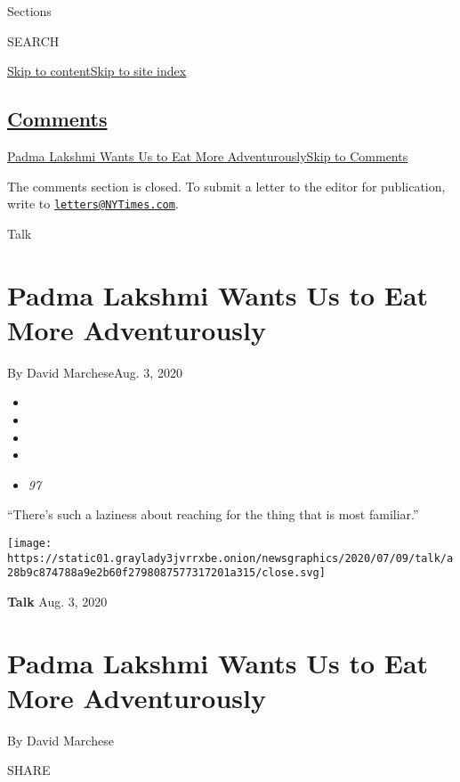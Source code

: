 Sections

SEARCH

\protect\hyperlink{site-content}{Skip to
content}\protect\hyperlink{site-index}{Skip to site index}

\hypertarget{comments}{%
\subsection{\texorpdfstring{\protect\hyperlink{commentsContainer}{Comments}}{Comments}}\label{comments}}

\href{}{Padma Lakshmi Wants Us to Eat More Adventurously}\href{}{Skip to
Comments}

The comments section is closed. To submit a letter to the editor for
publication, write to
\href{mailto:letters@NYTimes.com}{\nolinkurl{letters@NYTimes.com}}.

Talk

\hypertarget{padma-lakshmi-wants-us-to-eat-more-adventurously}{%
\section{Padma Lakshmi Wants Us to Eat More
Adventurously}\label{padma-lakshmi-wants-us-to-eat-more-adventurously}}

By David MarcheseAug. 3, 2020

\begin{itemize}
\item
\item
\item
\item
\item
  \emph{97}
\end{itemize}

``There's such a laziness about reaching for the thing that is most
familiar.''

\texttt{[image: https://static01.graylady3jvrrxbe.onion/newsgraphics/2020/07/09/talk/a28b9c874788a9e2b60f2798087577317201a315/close.svg]}

\textbf{Talk} Aug. 3, 2020

\hypertarget{padma-lakshmi-wants-us-to-eat-more-adventurously-1}{%
\section{Padma Lakshmi Wants Us to Eat More
Adventurously}\label{padma-lakshmi-wants-us-to-eat-more-adventurously-1}}

By David Marchese

SHARE


